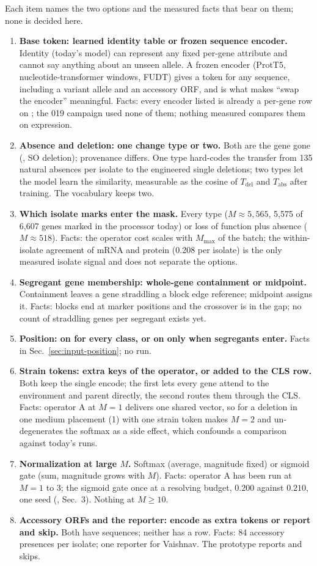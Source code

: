 Each item names the two options and the measured facts that bear on them; none is
decided here.

\begin{enumerate}
\item \textbf{Base token: learned identity table or frozen sequence encoder.} Identity
(today's model) can represent any fixed per-gene attribute and cannot say anything
about an unseen allele. A frozen encoder (ProtT5, nucleotide-transformer windows, FUDT)
gives a token for any sequence, including a variant allele and an accessory ORF, and
is what makes ``swap the encoder'' meaningful. Facts: every encoder listed is already a
per-gene row on ; the 019 campaign used none of them; nothing measured
compares them on expression.
\item \textbf{Absence and deletion: one change type or two.} Both are the gene gone
(, SO deletion); provenance differs. One type hard-codes the
transfer from 135 natural absences per isolate to the engineered single deletions;
two types let the model learn the similarity, measurable as the cosine of
$T_{\mathrm{del}}$ and $T_{\mathrm{abs}}$ after training. The vocabulary keeps two.
\item \textbf{Which isolate marks enter the mask.} Every type ($M\approx 5{,}565$,
5{,}575 of 6{,}607 genes marked in the processor today) or loss of function plus
absence ($M\approx 518$). Facts: the operator cost scales with $M_{\max}$ of the batch;
the within-isolate agreement of mRNA and protein (0.208 per isolate) is the only
measured isolate signal and does not separate the options.
\item \textbf{Segregant gene membership: whole-gene containment or midpoint.}
Containment leaves a gene straddling a block edge reference; midpoint assigns it. Facts:
blocks end at marker positions and the crossover is in the gap; no count of straddling
genes per segregant exists yet.
\item \textbf{Position: on for every class, or on only when segregants enter.} Facts in
Sec.~\ref{sec:input-position}; no run.
\item \textbf{Strain tokens: extra keys of the operator, or added to the CLS row.} Both
keep the single encode; the first lets every gene attend to the environment and parent
directly, the second routes them through the CLS. Facts: operator A at $M=1$ delivers
one shared vector, so for a deletion in one medium placement (1) with one strain token
makes $M=2$ and un-degenerates the softmax as a side effect, which confounds a
comparison against today's runs.
\item \textbf{Normalization at large $M$.} Softmax (average, magnitude fixed) or sigmoid
gate (sum, magnitude grows with $M$). Facts: operator A has been run at $M=1$ to 3; the
sigmoid gate once at a resolving budget, $0.200$ against $0.210$, one seed
(, Sec.~3). Nothing at $M\geq 10$.
\item \textbf{Accessory ORFs and the reporter: encode as extra tokens or report and
skip.} Both have sequences; neither has a row. Facts: 84 accessory presences per
isolate; one reporter for Vaishnav. The prototype reports and skips.
\end{enumerate}
